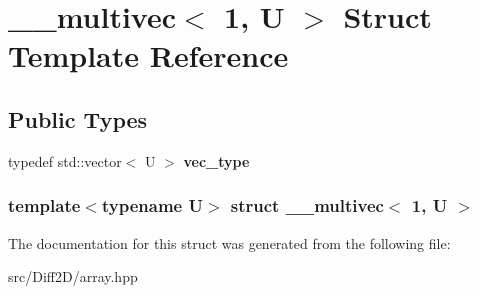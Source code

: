 \hypertarget{struct____multivec_3_011_00_01U_01_4}{
\section{\_\-\_\-multivec$<$ 1, U $>$ Struct Template Reference}
\label{struct____multivec_3_011_00_01U_01_4}
}
\subsection*{Public Types}
\begin{DoxyCompactItemize}
\item 
\hypertarget{struct____multivec_3_011_00_01U_01_4_abdf795a9397affa66935fdcc0f011188}{
typedef std::vector$<$ U $>$ {\bfseries vec\_\-type}}
\label{struct____multivec_3_011_00_01U_01_4_abdf795a9397affa66935fdcc0f011188}

\end{DoxyCompactItemize}
\subsubsection*{template$<$typename U$>$ struct \_\-\_\-multivec$<$ 1, U $>$}



The documentation for this struct was generated from the following file:\begin{DoxyCompactItemize}
\item 
src/Diff2D/array.hpp\end{DoxyCompactItemize}
